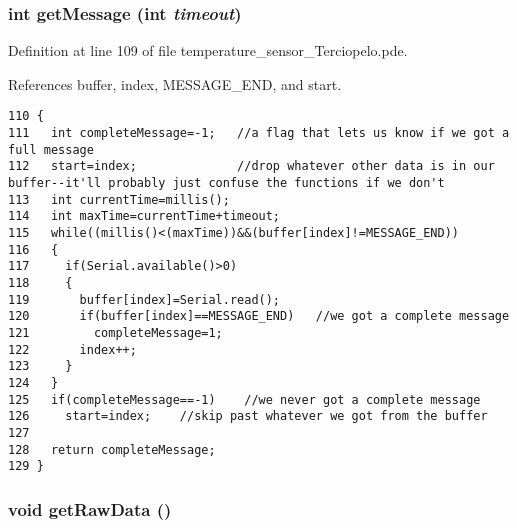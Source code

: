 \hypertarget{applet_2temperature__sensor___terciopelo_8pde_8f2521044963073c55b3c290fffd79e3}{
\subsubsection[{getMessage}]{\setlength{\rightskip}{0pt plus 5cm}int getMessage (int {\em timeout})}}
\label{applet_2temperature__sensor___terciopelo_8pde_8f2521044963073c55b3c290fffd79e3}




Definition at line 109 of file temperature\_\-sensor\_\-Terciopelo.pde.

References buffer, index, MESSAGE\_\-END, and start.

\begin{Code}\begin{verbatim}110 {
111   int completeMessage=-1;   //a flag that lets us know if we got a full message
112   start=index;              //drop whatever other data is in our buffer--it'll probably just confuse the functions if we don't
113   int currentTime=millis();
114   int maxTime=currentTime+timeout;  
115   while((millis()<(maxTime))&&(buffer[index]!=MESSAGE_END))
116   {
117     if(Serial.available()>0)
118     {
119       buffer[index]=Serial.read();
120       if(buffer[index]==MESSAGE_END)   //we got a complete message
121         completeMessage=1;
122       index++;
123     }
124   }
125   if(completeMessage==-1)    //we never got a complete message
126     start=index;    //skip past whatever we got from the buffer
127 
128   return completeMessage;
129 }
\end{verbatim}
\end{Code}


\hypertarget{applet_2temperature__sensor___terciopelo_8pde_cfc975251dbc3a8c9a9b11f8df62cc41}{
\subsubsection[{getRawData}]{\setlength{\rightskip}{0pt plus 5cm}void getRawData ()}}
\label{applet_2temperature__sensor___terciopelo_8pde_cfc975251dbc3a8c9a9b11f8df62cc41}


